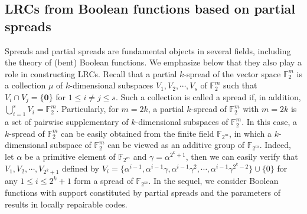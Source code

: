 \documentclass[10pt]{article}
\newcommand{\F}{\mathbb{F}}
\newcommand{\0}{\textbf{0}}
\newcommand{\1}{\textbf{1}}
\begin{document}
\subsection{LRCs from Boolean functions based on partial spreads}\label{LRC-PS}
Spreads and partial spreads are fundamental objects in several fields, including the theory of (bent) Boolean functions.
We emphasize below that they also play a role in constructing LRCs. Recall that a partial $k$-spread of the vector space $\F_2^m$ is a collection $\mu$ of $k$-dimensional subspaces
$V_{1}, V_{2}, \cdots, V_{s}$ of $\F_2^m$ such that $V_i\cap V_{j}=\{\0\}$ for $1\leq i\neq j\leq s$.
Such a collection is called a spread if, in addition, $\bigcup_{i=1}^{s} V_i=\F_2^m$.
Particularly, for $m=2k$, a partial $k$-spread of $\F_2^m$ with $m=2k$ is a set of pairwise
supplementary of $k$-dimensional subspaces of $\F_2^m$.
In this case, a $k$-spread of $\F_2^m$ can be easily obtained from the finite field $\F_{2^m}$,
in which a $k$-dimensional subspace of $\F_2^m$ can be viewed as an additive group of $\F_{2^m}$.
Indeed, let $\alpha$ be a primitive element of $\F_{2^m}$ and $\gamma=\alpha^{2^k+1}$, then we can
easily verify that
$V_{1}, V_{2}, \cdots, V_{2^k+1}$ defined by $V_i=\{\alpha^{i-1},\alpha^{i-1}\gamma,\alpha^{i-1}\gamma^2,\cdots,
\alpha^{i-1}\gamma^{2^k-2}\}\cup \{0\}$ for any $1\leq i \leq 2^k+1$ form a spread of $\F_{2^m}$.
In the sequel, we consider Boolean functions with support constituted by partial spreads and
the parameters of results in locally repairable codes.
\end{document}
